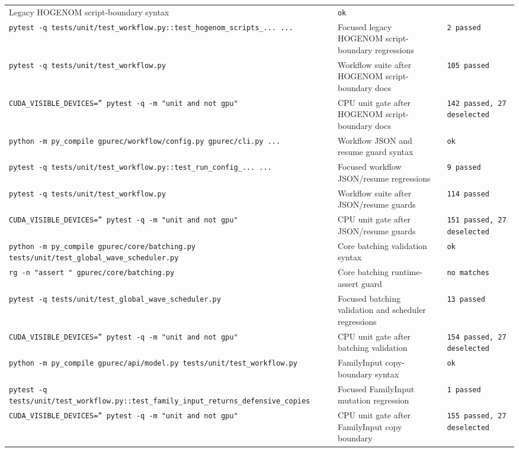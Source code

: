 \documentclass[11pt]{article}
\begin{document}
\begin{center}
\begin{tabular}{lll}
Legacy HOGENOM script-boundary syntax &
\texttt{ok} \\
\texttt{pytest -q tests/unit/test\_workflow.py::test\_hogenom\_scripts\_... ...} &
Focused legacy HOGENOM script-boundary regressions &
\texttt{2 passed} \\
\texttt{pytest -q tests/unit/test\_workflow.py} &
Workflow suite after HOGENOM script-boundary docs &
\texttt{105 passed} \\
\texttt{CUDA\_VISIBLE\_DEVICES='' pytest -q -m "unit and not gpu"} &
CPU unit gate after HOGENOM script-boundary docs &
\texttt{142 passed, 27 deselected} \\
\texttt{python -m py\_compile gpurec/workflow/config.py gpurec/cli.py ...} &
Workflow JSON and resume guard syntax &
\texttt{ok} \\
\texttt{pytest -q tests/unit/test\_workflow.py::test\_run\_config\_... ...} &
Focused workflow JSON/resume regressions &
\texttt{9 passed} \\
\texttt{pytest -q tests/unit/test\_workflow.py} &
Workflow suite after JSON/resume guards &
\texttt{114 passed} \\
\texttt{CUDA\_VISIBLE\_DEVICES='' pytest -q -m "unit and not gpu"} &
CPU unit gate after JSON/resume guards &
\texttt{151 passed, 27 deselected} \\
\texttt{python -m py\_compile gpurec/core/batching.py tests/unit/test\_global\_wave\_scheduler.py} &
Core batching validation syntax &
\texttt{ok} \\
\texttt{rg -n "assert " gpurec/core/batching.py} &
Core batching runtime-assert guard &
\texttt{no matches} \\
\texttt{pytest -q tests/unit/test\_global\_wave\_scheduler.py} &
Focused batching validation and scheduler regressions &
\texttt{13 passed} \\
\texttt{CUDA\_VISIBLE\_DEVICES='' pytest -q -m "unit and not gpu"} &
CPU unit gate after batching validation &
\texttt{154 passed, 27 deselected} \\
\texttt{python -m py\_compile gpurec/api/model.py tests/unit/test\_workflow.py} &
FamilyInput copy-boundary syntax &
\texttt{ok} \\
\texttt{pytest -q tests/unit/test\_workflow.py::test\_family\_input\_returns\_defensive\_copies} &
Focused FamilyInput mutation regression &
\texttt{1 passed} \\
\texttt{CUDA\_VISIBLE\_DEVICES='' pytest -q -m "unit and not gpu"} &
CPU unit gate after FamilyInput copy boundary &
\texttt{155 passed, 27 deselected} \\

\end{tabular}
\end{center}
\end{document}
